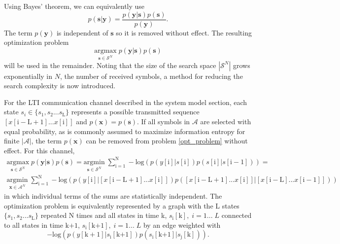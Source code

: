 Using Bayes' theorem, we can equivalently use 
\begin{equation*}
p(\mathbf{s}|\mathbf{y}) = 
\frac
{p(\mathbf{y}|\mathbf{s})p(\mathbf{s})}
{p(\mathbf{y})}.
\end{equation*}
The term $p(\mathbf{y})$ is independent of $\mathbf{s}$ so it is removed without effect. The resulting optimization problem
\begin{equation}\label{opt_problem}
\underset{\mathbf{s}\in\mathcal{S}^N}{\text{argmax}}\; p(\mathbf{y}|\mathbf{s})p(\mathbf{s})
\end{equation}
will be used in the remainder.
Noting that the size of the search space $|\mathcal{S}^N|$ grows exponentially in $N$, the number of received symbols, a method for reducing the search complexity is now introduced. 
\par
For the LTI communication channel described in the system model section, each state $s_i \in \{s_1, s_2... s_{\text{L}}\}$ represents a possible transmitted sequence $[x[\mathrm{i-L+1}]...x[\mathrm{i}]]$  and $p(\mathbf{x})=p(\mathbf{s})$. If all symbols in $\mathcal{A}$ are selected with equal probability, as is commonly assumed to maximize information entropy for finite $|\mathcal{A}|$, the term $p(\mathbf{x})$ can be removed from problem \ref{opt_problem} without effect. 
For this channel,
\begin{gather*}
\underset{\mathbf{s}\in\mathcal{S}^N}{\text{argmax}} \; p(\mathbf{y}|\mathbf{s})p(\mathbf{s})=
\underset{\mathbf{s}\in\mathcal{S}^N}{\text{argmin}} \; \sum_{\mathrm{i=1}}^{\mathrm{N}} -\text{log}(p(y[\mathrm{i}]|s[\mathrm{i}]) p(s[\mathrm{i}]|s[\mathrm{i-1}]))=\\
\underset{\mathbf{x}\in\mathcal{A}^N}{\text{argmin}} \; \sum_{\mathrm{i=1}}^{\mathrm{N}} -\text{log}(p(y[\mathrm{i}]|\left[x[\mathrm{i-L+1}]...x[\mathrm{i}]\right]) p(\left[x[\mathrm{i-L+1}]...x[\mathrm{i}]\right]|\left[x[\mathrm{i-L}]...x[\mathrm{i-1}]\right]))
\end{gather*}
in which individual terms of the sums are statistically independent. The optimization problem is equivalently
  represented by a graph with the L states $\{s_1, s_2... s_{\text{L}}\}$ repeated N times and all states in time k, $s_{\text{i}}[\text{k}], \; i = 1... \;L$ connected to all states in time k$+1$, $s_{\text{i}}[\text{k+1}], \; i = 1... \;L$ 
   by an edge weighted with
\begin{equation*}
-\text{log}(p(y[\text{k}+1]|s_{\text{i}}[\text{k+1}])p(s_{\text{i}}[\text{k+1}]|s_{\text{j}}[\text{k}])).
\end{equation*}   
